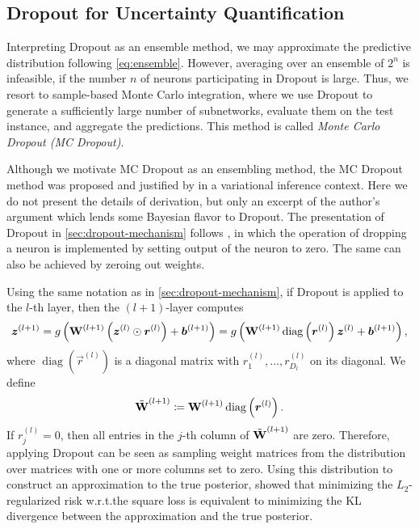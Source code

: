 \subsection{Dropout for Uncertainty Quantification}


Interpreting Dropout as an ensemble method, we may approximate the predictive distribution following \eqref{eq:ensemble}. However, averaging over an ensemble of $2^n$ is infeasible, if the number $n$ of neurons participating in Dropout is large. Thus, we resort to sample-based Monte Carlo integration, where we use Dropout to generate a sufficiently large number of subnetworks, evaluate them on the test instance, and aggregate the predictions. This method is called \emph{Monte Carlo Dropout (MC Dropout)}.

Although we motivate MC Dropout as an ensembling method, the MC Dropout method was proposed and justified by \cite{galDropoutBayesianApproximation2016} in a variational inference context. Here we do not present the details of derivation, but only an excerpt of the author's argument which lends some Bayesian flavor to Dropout. The presentation of Dropout in \cref{sec:dropout-mechanism} follows \cite{srivastavaDropout2014}, in which the operation of dropping a neuron is implemented by setting output of the neuron to zero. The same can also be achieved by zeroing out weights.

Using the same notation as in \cref{sec:dropout-mechanism}, if Dropout is applied to the $l$-th layer, then the $(l+1)$-layer computes
\begin{align*}
  \bm{z}^{(l+1)} = g\left( \bm{\mathbf{W}}^{(l+1)} \left( \bm{z}^{(l)} \odot \bm{r}^{(l)} \right) + \bm{b}^{(l+1)} \right)
  = g\left( \bm{\mathbf{W}}^{(l+1)} \operatorname{diag}\left( \bm{r}^{(l)} \right) \bm{z}^{(l)} + \bm{b}^{(l+1)} \right),
\end{align*}
where $\operatorname{diag}(\vec{r}^{(l)})$ is a diagonal matrix with $r_1^{(l)}, \dots, r_{D_l}^{(l)}$ on its diagonal. We define
\begin{equation*}
  \tilde{\bm{\mathbf{W}}}^{(l+1)} \coloneqq \bm{\mathbf{W}}^{(l+1)} \operatorname{diag}\left( \bm{r}^{(l)} \right).
\end{equation*}
If $r_j^{(l)} = 0$, then all entries in the $j$-th column of $\tilde{\bm{\mathbf{W}}}^{(l+1)}$ are zero. Therefore, applying Dropout can be seen as sampling weight matrices from the distribution over matrices with one or more columns set to zero. Using this distribution to construct an approximation to the true posterior, \cite{galDropoutBayesianApproximation2016} showed that minimizing the $L_2$-regularized risk w.r.t.\@ the square loss is equivalent to minimizing the KL divergence between the approximation and the true posterior.
